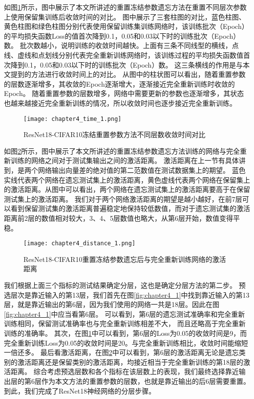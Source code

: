 如图\ref{fig:chapter4_time_1}所示，图中展示了本文所讲述的重置冻结参数遗忘方法在重置不同层次参数上使用保留集训练后收敛时间的对比。
图中展示了三套柱图的对比，蓝色柱图、黄色柱图和绿色柱图分别代表使用保留训练集训练网络时，该训练批次（Epoch）的平均损失函数Loss的值首次降到0.1，0.05和0.03以下时的训练批次（Epoch）数。
批次数越小，说明训练的收敛时间越快。上面有三条不同线型的横线，点线、虚线和点划线分别代表完全重新训练网络时，该训练过程的平均损失函数值首次降到0.1，0.05和0.03以下时的训练批次（Epoch）数。
这三条横线的作用是与本文提到的方法进行收敛时间上的对比。
从图中的柱状图可以看出，随着重置参数的层数逐渐增多，其收敛的Epoch逐渐增大，逐渐接近完全重新训练时收敛的Epoch。
随着重置参数的层数增多，网络中需要更新的参数也逐渐增多，其状态也越来越接近完全重新训练的情况，所以收敛时间也逐步接近完全重新训练。
\begin{figure}
    \centering
    \texttt{[image: chapter4\_time\_1.png]}
    \caption{ResNet18-CIFAR10冻结重置参数方法不同层数收敛时间对比}
    \label{fig:chapter4_time_1}
\end{figure}

如图\ref{fig:chapter4_distance_1}所示，图中展示了本文所讲述的重置冻结参数遗忘方法训练的网络与完全重新训练的网络之间对于测试集输出之间的激活距离。
激活距离在上一节有具体讲到，是两个网络输出向量差的绝对值的第二范数值在测试数据集上的期望。
蓝色实线代表两个网络在遗忘测试集上的激活距离，黄色虚线代表两个网络在保留集上的激活距离。从图中可以看出，两个网络在遗忘测试集上的激活距离要高于在保留测试集上的激活距离。
我们对于两个网络激活距离的期望是越小越好，在前7层可以看到保留测试集的激活距离普遍稳定地保持较低数值，而对于遗忘测试集的激活距离前2层的数值相对较大，3、4、5层数值也略大，从第6层开始，数值变得平稳。
\begin{figure}
    \centering
    \texttt{[image: chapter4\_distance\_1.png]}
    \caption{ResNet18-CIFAR10重置冻结参数遗忘后与完全重新训练网络的激活距离}
    \label{fig:chapter4_distance_1}
\end{figure}

我们根据上面三个指标的测试结果确定分层，这也是确定分层方法的第二步。
预选层次是靠近输入的第13层，我们首先在图\ref{fig:chapter4_1}中找到靠近输入的第13层，就是靠近输出的第6层，因为我们使用的网络一共是18层。因此在图\ref{fig:chapter4_1}中应当看第6层。
可以看到，第6层的遗忘测试准确率和完全重新训练相同，保留测试准确率也与完全重新训练相差不大， 而且还略高于完全重新训练的准确率。
其次，在图\ref{fig:chapter4_time_1}中可以看到，第6层的Loss为0.05的收敛时间是9，而完全重新训练Loss为0.05的收敛时间是20。与完全重新训练相比，收敛时间能缩短一倍还多。
最后看激活距离，在图\ref{fig:chapter4_distance_1}中可以看到，第6层的激活距离无论是遗忘类别的激活距离还是保留类别的激活距离，均接近相当于完全重新训练的第18层的激活距离。
综合考虑预选层数和各个指标在该层数上的表现，我们最终选择靠近输出层的第6层作为本文方法的重置参数的层数，也就是靠近输出的后6层需要重置。
到此，我们完成了ResNet18神经网络的分层步骤。

